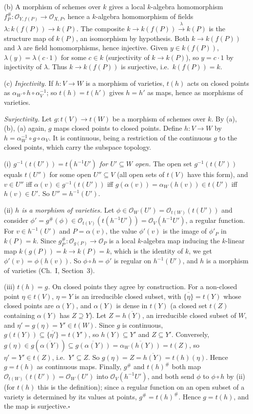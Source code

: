 \documentclass[11pt]{article}
\begin{document}
(b) A morphism of schemes over $k$ gives a local $k$-algebra homomorphism $f^\#_P:\mathcal O_{Y,f(P)}\to\mathcal O_{X,P}$, hence a $k$-algebra homomorphism of fields $\lambda:k(f(P))\to k(P)$. The composite $k\to k(f(P))\xrightarrow{\lambda}k(P)$ is the structure map of $k(P)$, an isomorphism by hypothesis. Both $k\to k(f(P))$ and $\lambda$ are field homomorphisms, hence injective. Given $y\in k(f(P))$, $\lambda(y)=\lambda(c\cdot1)$ for some $c\in k$ (surjectivity of $k\to k(P)$), so $y=c\cdot1$ by injectivity of $\lambda$. Thus $k\to k(f(P))$ is surjective, i.e.\ $k(f(P))=k$.

(c) \emph{Injectivity.} If $h:V\to W$ is a morphism of varieties, $t(h)$ acts on closed points as $\alpha_W\circ h\circ\alpha_V^{-1}$; so $t(h)=t(h')$ gives $h=h'$ as maps, hence as morphisms of varieties.

\emph{Surjectivity.} Let $g:t(V)\to t(W)$ be a morphism of schemes over $k$. By (a), (b), (a) again, $g$ maps closed points to closed points. Define $h:V\to W$ by $h=\alpha_W^{-1}\circ g\circ\alpha_V$. It is continuous, being a restriction of the continuous $g$ to the closed points, which carry the subspace topology.

(i) \emph{$g^{-1}(t(U'))=t(h^{-1}U')$ for $U'\subseteq W$ open.} The open set $g^{-1}(t(U'))$ equals $t(U'')$ for some open $U''\subseteq V$ (all open sets of $t(V)$ have this form), and $v\in U''$ iff $\alpha(v)\in g^{-1}(t(U'))$ iff $g(\alpha(v))=\alpha_W(h(v))\in t(U')$ iff $h(v)\in U'$. So $U''=h^{-1}(U')$.

(ii) \emph{$h$ is a morphism of varieties.} Let $\phi\in\mathcal O_W(U')=\mathcal O_{t(W)}(t(U'))$ and consider $\phi'=g^\#(\phi)\in\mathcal O_{t(V)}(t(h^{-1}U'))=\mathcal O_V(h^{-1}U')$, a regular function. For $v\in h^{-1}(U')$ and $P=\alpha(v)$, the value $\phi'(v)$ is the image of $\phi'_P$ in $k(P)=k$. Since $g^\#_P:\mathcal O_{g(P)}\to\mathcal O_P$ is a local $k$-algebra map inducing the $k$-linear map $k(g(P))=k\to k(P)=k$, which is the identity of $k$, we get $\phi'(v)=\phi(h(v))$. So $\phi\circ h=\phi'$ is regular on $h^{-1}(U')$, and $h$ is a morphism of varieties (Ch.~I, Section~3).

(iii) \emph{$t(h)=g$.} On closed points they agree by construction. For a non-closed point $\eta\in t(V)$, $\eta=Y$ is an irreducible closed subset, with $\overline{\{\eta\}}=t(Y)$ whose closed points are $\alpha(Y)$, and $\alpha(Y)$ is dense in $t(Y)$ (a closed set $t(Z)$ containing $\alpha(Y)$ has $Z\supseteq Y$). Let $Z=\overline{h(Y)}$, an irreducible closed subset of $W$, and $\eta'=g(\eta)=Y'\in t(W)$. Since $g$ is continuous, $g(t(Y))\subseteq\overline{\{\eta'\}}=t(Y')$, so $h(Y)\subseteq Y'$ and $Z\subseteq Y'$. Conversely, $g(\eta)\in g(\overline{\alpha(Y)})\subseteq\overline{g(\alpha(Y))}=\overline{\alpha_W(h(Y))}=t(Z)$, so $\eta'=Y'\in t(Z)$, i.e.\ $Y'\subseteq Z$. So $g(\eta)=Z=\overline{h(Y)}=t(h)(\eta)$. Hence $g=t(h)$ as continuous maps. Finally, $g^\#$ and $t(h)^\#$ both map $\mathcal O_{t(W)}(t(U'))=\mathcal O_W(U')$ into $\mathcal O_V(h^{-1}U')$, and both send $\phi$ to $\phi\circ h$ by (ii) (for $t(h)$ this is the definition); since a regular function on an open subset of a variety is determined by its values at points, $g^\#=t(h)^\#$. Hence $g=t(h)$, and the map is surjective.\hfill$\square$
\end{document}

